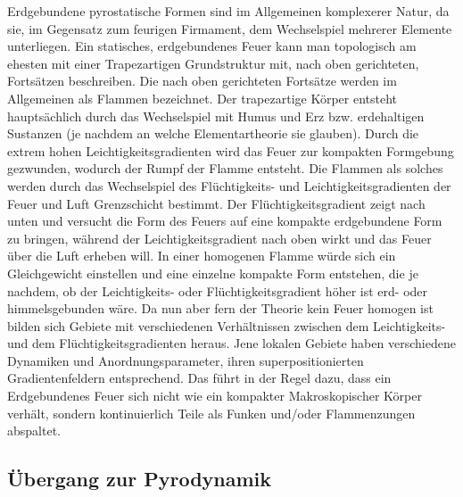 \documentclass[a5paper,8pt]{book}
\begin{document}
Erdgebundene pyrostatische Formen sind im Allgemeinen komplexerer Natur, da sie, im Gegensatz zum feurigen Firmament, 
dem Wechselspiel mehrerer Elemente unterliegen. Ein statisches, erdgebundenes Feuer kann man topologisch am ehesten mit 
einer Trapezartigen Grundstruktur mit, nach oben gerichteten, Fortsätzen beschreiben. Die nach oben gerichteten Fortsätze 
werden im Allgemeinen als Flammen bezeichnet.
Der trapezartige Körper entsteht hauptsächlich durch das Wechselspiel mit Humus und Erz bzw. erdehaltigen Sustanzen (je 
nachdem an welche Elementartheorie sie glauben). Durch die extrem hohen Leichtigkeitsgradienten wird das Feuer zur 
kompakten Formgebung gezwunden, wodurch der Rumpf der Flamme entsteht. Die Flammen als solches werden durch das 
Wechselspiel des Flüchtigkeits- und Leichtigkeitsgradienten der Feuer und Luft Grenzschicht bestimmt. Der 
Flüchtigkeitsgradient zeigt nach unten und versucht die Form des Feuers auf eine kompakte erdgebundene Form zu bringen, 
während der Leichtigkeitsgradient nach oben wirkt und das Feuer über die Luft erheben will. In einer homogenen Flamme 
würde sich ein Gleichgewicht einstellen und eine einzelne kompakte Form entstehen, die je nachdem, ob der Leichtigkeits- oder 
Flüchtigkeitsgradient höher ist erd- oder himmelsgebunden wäre.
Da nun aber fern der Theorie kein Feuer homogen ist bilden sich Gebiete mit verschiedenen Verhältnissen zwischen dem 
Leichtigkeits- und dem Flüchtigkeitsgradienten heraus. Jene lokalen Gebiete haben verschiedene Dynamiken und 
Anordnungsparameter, ihren superpositionierten Gradientenfeldern entsprechend.
Das führt in der Regel dazu, dass ein Erdgebundenes Feuer sich nicht wie ein kompakter Makroskopischer Körper verhält, 
sondern kontinuierlich Teile als Funken und/oder Flammenzungen abspaltet.


\subsection{Übergang zur Pyrodynamik}
\end{document}
